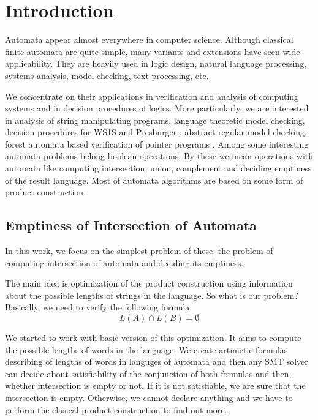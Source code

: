 \chapter{Introduction}
Automata appear almost everywhere in computer science. Although classical finite automata are quite simple, many variants and extensions have seen wide applicability. They are heavily used in logic design, natural language processing, systems analysis, model checking, text processing, etc.

We concentrate on their applications in verification and analysis of computing systems and in decision procedures of logics. More particularly, we are interested in analysis of string manipulating programs, language theoretic model checking, decision procedures for WS1S \cite{ws1s} and Presburger \cite{presburger}, abstract regular model checking, forest automata based verification of pointer programs \cite{forest}.
Among some interesting automata problems belong boolean operations. By these we mean operations with automata like computing intersection, union, complement and deciding emptiness of the result language. Most of automata algorithms are based on some form of product construction.

\section{Emptiness of Intersection of Automata}
In this work, we focus on the simplest problem of these, the problem of computing intersection of automata and deciding its emptiness.

The main idea is optimization of the product construction using information about the possible lengths of strings in the language. So what is our problem? Basically, we need to verify the following formula:
\begin{equation*}
L(A) \cap L(B) = \emptyset
\end{equation*}

We started to work with basic version of this optimization. It aims to compute the possible lengths of words in the language. We create artimetic formulas describing of lengths of words in languges of automata and then any SMT solver can decide about satisfiability of the conjunction of both formulas and then, whether intersection is empty or not. If it is not satisfiable, we are sure that the intersection is empty. Otherwise, we cannot declare anything and we have to perform the clasical product construction to find out more.

